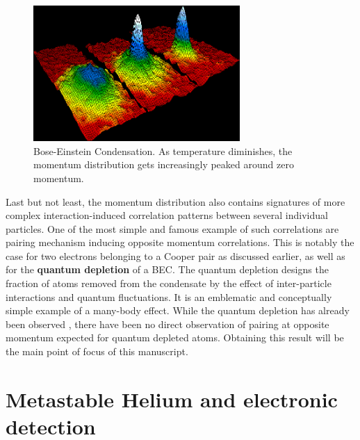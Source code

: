\begin{figure}
    \centering
    \includegraphics[width=0.7\textwidth]{Fig/Intro/BEC.png}
    \caption[Momentum distribution across Bose-Einstein Condensation]{Bose-Einstein Condensation. As temperature diminishes, the momentum distribution gets increasingly peaked around zero momentum.}
    \label{fig:1st_BEC}
\end{figure}


Last but not least, the momentum distribution also contains signatures of more complex interaction-induced correlation patterns between several individual particles. One of the most simple and famous example of such correlations are pairing mechanism inducing opposite momentum correlations. This is notably the case for two electrons belonging to a Cooper pair as discussed earlier, as well as for the \textbf{quantum depletion} of a BEC. The quantum depletion designs the fraction of atoms removed from the condensate by the effect of inter-particle interactions and quantum fluctuations. It is an emblematic and conceptually simple example of a many-body effect. While the quantum depletion has already been observed \cite{chang2016,lopes2017,xu2006observation}, there have been no direct observation of pairing at opposite momentum expected for quantum depleted atoms. Obtaining this result will be the main point of focus of this manuscript.

\section*{Metastable Helium and electronic detection}

